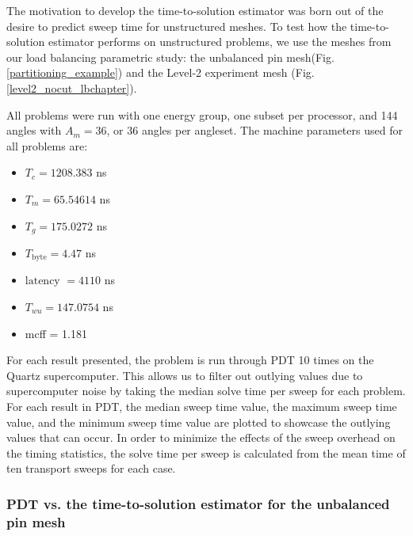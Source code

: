 \documentclass[times,final]{elsarticle}
\begin{document}
The motivation to develop the time-to-solution estimator was born out of the desire to predict sweep time for unstructured meshes.
To test how the time-to-solution estimator performs on unstructured problems, we use the meshes from our load balancing parametric study: the unbalanced pin mesh(Fig. \ref{partitioning_example}) and the Level-2 experiment mesh (Fig. \ref{level2_nocut_lbchapter}).

All problems were run with one energy group, one subset per processor, and 144 angles with $A_m = 36$, or 36 angles per angleset. The machine parameters used for all problems are:
\begin{itemize}
  \item $T_c = 1208.383$ ns
  \item $T_m = 65.54614$ ns
  \item $T_g = 175.0272$ ns
  \item $T_\text{byte} = 4.47$ ns
  \item $\text{latency }= 4110$ ns
  \item $T_{wu} = 147.0754$ ns
  \item mcff = 1.181
\end{itemize}

For each result presented, the problem is run through PDT 10 times on the Quartz supercomputer.
This allows us to filter out outlying values due to supercomputer noise by taking the median solve time per sweep for each problem.
For each result in PDT, the median sweep time value, the maximum sweep time value, and the minimum sweep time value are plotted to showcase the outlying values that can occur.
In order to minimize the effects of the sweep overhead on the timing statistics, the solve time per sweep is calculated from the mean time of ten transport sweeps for each case.

\subsubsection{PDT vs. the time-to-solution estimator for the unbalanced pin mesh}
\end{document}
